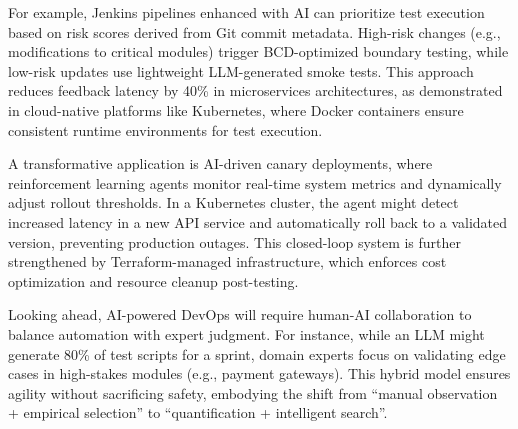\documentclass[manuscript,screen,review]{acmart}
\begin{document}
For example, Jenkins pipelines enhanced with AI can prioritize test execution based on risk scores derived from Git commit metadata. High-risk changes (e.g., modifications to critical modules) trigger BCD-optimized boundary testing, while low-risk updates use lightweight LLM-generated smoke tests. This approach reduces feedback latency by 40\% in microservices architectures, as demonstrated in cloud-native platforms like Kubernetes, where Docker containers ensure consistent runtime environments for test execution.

A transformative application is AI-driven canary deployments, where reinforcement learning agents monitor real-time system metrics and dynamically adjust rollout thresholds. In a Kubernetes cluster, the agent might detect increased latency in a new API service and automatically roll back to a validated version, preventing production outages. This closed-loop system is further strengthened by Terraform-managed infrastructure, which enforces cost optimization and resource cleanup post-testing.

Looking ahead, AI-powered DevOps will require human-AI collaboration to balance automation with expert judgment. For instance, while an LLM might generate 80\% of test scripts for a sprint, domain experts focus on validating edge cases in high-stakes modules (e.g., payment gateways). This hybrid model ensures agility without sacrificing safety, embodying the shift from ``manual observation + empirical selection'' to ``quantification + intelligent search''.

\vspace{2ex}
\end{document}
